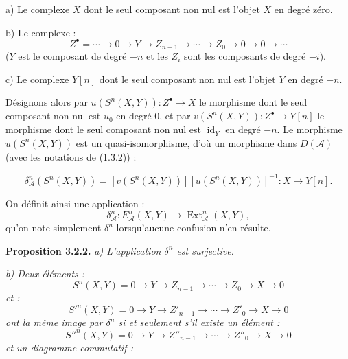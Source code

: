 \clearpage
{}%
\begingroup\small\setlength{\parskip}{0pt}\setlength{\emergencystretch}{1.5em}
\setlength{\abovedisplayskip}{4pt plus 2pt minus 2pt}%
\setlength{\belowdisplayskip}{4pt plus 2pt minus 2pt}%

\noindent a) Le complexe $X$ dont le seul composant non nul est l'objet $X$
en degré zéro.

\noindent b) Le complexe :
\[
Z^\bullet=\cdots\longrightarrow0\longrightarrow Y
\longrightarrow Z_{n-1}\longrightarrow\cdots\longrightarrow Z_0
\longrightarrow0\longrightarrow0\longrightarrow\cdots
\]
($Y$ est le composant de degré $-n$ et les $Z_i$ sont les composants de
degré $-i$).

\noindent c) Le complexe $Y[n]$ dont le seul composant non nul est l'objet
$Y$ en degré $-n$.

Désignons alors par
$u(S^n(X,Y))\colon Z^\bullet\longrightarrow X$ le morphisme dont le seul
composant non nul est $u_0$ en degré $0$, et par
$v(S^n(X,Y))\colon Z^\bullet\longrightarrow Y[n]$ le morphisme dont le seul
composant non nul est $\operatorname{id}_Y$ en degré $-n$. Le morphisme
$u(S^n(X,Y))$ est un quasi-isomorphisme, d'où un morphisme dans
$D(\mathcal A)$ (avec les notations de (1.3.2)) :

\begin{equation}
\delta_{\mathcal A}^{n}(S^n(X,Y))=
[v(S^n(X,Y))][u(S^n(X,Y))]^{-1}\colon X\longrightarrow Y[n].
\tag{3.2.1.1}
\end{equation}

On définit ainsi une application :
\begin{equation}
\delta_{\mathcal A}^{n}\colon E_{\mathcal A}^{n}(X,Y)
\longrightarrow\operatorname{Ext}_{\mathcal A}^{n}(X,Y),
\tag{3.2.1.2}
\end{equation}
qu'on note simplement $\delta^n$ lorsqu'aucune confusion n'en résulte.

\medskip\noindent\textbf{Proposition 3.2.2.}\quad
\textit{a) L'application $\delta^n$ est surjective.}

\noindent\textit{b) Deux éléments :}
\[
S^n(X,Y)=0\longrightarrow Y\longrightarrow Z_{n-1}
\longrightarrow\cdots\longrightarrow Z_0\longrightarrow X
\longrightarrow0
\]
\noindent\textit{et :}
\[
{S'}^n(X,Y)=0\longrightarrow Y\longrightarrow Z'_{n-1}
\longrightarrow\cdots\longrightarrow Z'_0\longrightarrow X
\longrightarrow0
\]
\noindent\textit{ont la même image par $\delta^n$ si et seulement s'il
existe un élément :}
\[
{S''}^n(X,Y)=0\longrightarrow Y\longrightarrow Z''_{n-1}
\longrightarrow\cdots\longrightarrow Z''_0\longrightarrow X
\longrightarrow0
\]
\noindent\textit{et un diagramme commutatif :}

